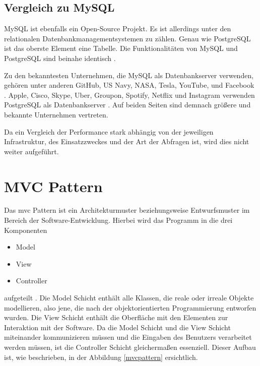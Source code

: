\subsection{Vergleich zu MySQL}
MySQL ist ebenfalls ein Open-Source Projekt. Es ist allerdings unter den relationalen Datenbankmanagementsystemen zu zählen. Genau wie PostgreSQL ist das oberste Element eine Tabelle. Die Funktionalitäten von MySQL und PostgreSQL sind beinahe identisch \cite{postgres-mysql-comparison}.

Zu den bekanntesten Unternehmen, die MySQL als Datenbankserver verwenden, gehören unter anderen GitHub, US Navy, NASA, Tesla, YouTube, und Facebook \cite{mysql-companies}.
Apple, Cisco, Skype, Uber, Groupon, Spotify, Netflix und Instagram verwenden PostgreSQL als Datenbankserver \cite{postgres-companies}.
Auf beiden Seiten sind demnach größere und bekannte Unternehmen vertreten.

Da ein Vergleich der Performance stark abhängig von der jeweiligen Infrastruktur, des Einsatzzweckes und der Art der Abfragen ist, wird dies nicht weiter aufgeführt.

\clearpage

\section{MVC Pattern}\label{mvc}
Das \gls{mvc} Pattern ist ein Architekturmuster beziehungsweise Entwurfsmuster im Bereich der Software-Entwicklung. 
Hierbei wird das Programm in die drei Komponenten
\begin{itemize}
	\item Model
	\item View
	\item Controller
\end{itemize}
aufgeteilt \cite[S.~18]{spring-book-3}. Die Model Schicht enthält alle Klassen, die reale oder irreale Objekte modellieren, also jene, die nach der objektorientierten Programmierung entworfen wurden. Die View Schicht enthält die Oberfläche mit den Elementen zur Interaktion mit der Software. Da die Model Schicht und die View Schicht miteinander kommunizieren müssen und die Eingaben des Benutzers verarbeitet werden müssen, ist die Controller Schicht gleichermaßen essenziell. Dieser Aufbau ist, wie beschrieben, in der Abbildung \ref{mvcpattern} ersichtlich.


